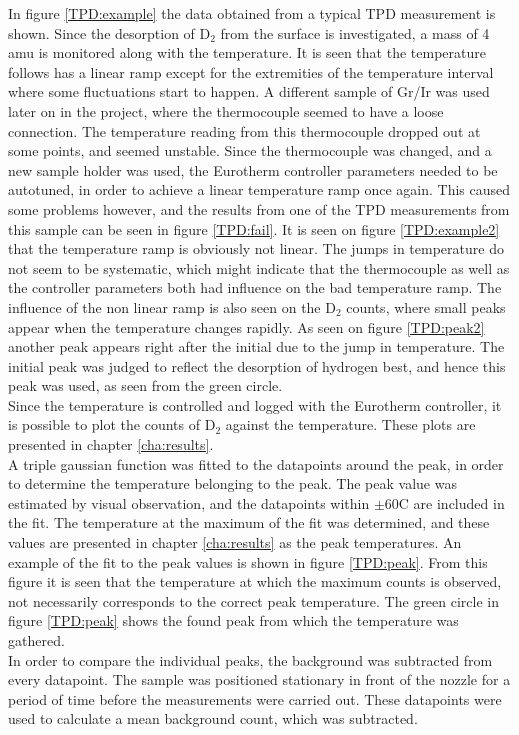 In figure \ref{TPD:example} the data obtained from a typical TPD measurement is shown. Since the desorption of D$_2$ from the surface is investigated, a mass of 4 amu is monitored along with the temperature. It is seen that the temperature follows has a linear ramp except for the extremities of the temperature interval where some fluctuations start to happen. A different sample of Gr/Ir was used later on in the project, where the thermocouple seemed to have a loose connection. The temperature reading from this thermocouple dropped out at some points, and seemed unstable. Since the thermocouple was changed, and a new sample holder was used, the Eurotherm controller parameters needed to be autotuned, in order to achieve a linear temperature ramp once again. This caused some problems however, and the results from one of the TPD measurements from this sample can be seen in figure \ref{TPD:fail}. It is seen on figure \ref{TPD:example2} that the temperature ramp is obviously not linear. The jumps in temperature do not seem to be systematic, which might indicate that the thermocouple as well as the controller parameters both had influence on the bad temperature ramp. The influence of the non linear ramp is also seen on the D$_2$ counts, where small peaks appear when the temperature changes rapidly. As seen on figure \ref{TPD:peak2} another peak appears right after the initial due to the jump in temperature. The initial peak was judged to reflect the desorption of hydrogen best, and hence this peak was used, as seen from the green circle. \\
Since the temperature is controlled and logged with the Eurotherm controller, it is possible to plot the counts of D$_2$ against the temperature. These plots are presented in chapter \ref{cha:results}.\\
A triple gaussian function was fitted to the datapoints around the peak, in order to determine the temperature belonging to the peak. The peak value was estimated by visual observation, and the datapoints within $\pm$60\degree C are included in the fit. The temperature at the maximum of the fit was determined, and these values are presented in chapter \ref{cha:results} as the peak temperatures. An example of the fit to the peak values is shown in figure \ref{TPD:peak}. From this figure it is seen that the temperature at which the maximum counts is observed, not necessarily corresponds to the correct peak temperature. The green circle in figure \ref{TPD:peak} shows the found peak from which the temperature was gathered.\\
In order to compare the individual peaks, the background was subtracted from every datapoint. The sample was positioned stationary in front of the nozzle for a period of time before the measurements were carried out. These datapoints were used to calculate a mean background count, which was subtracted.

